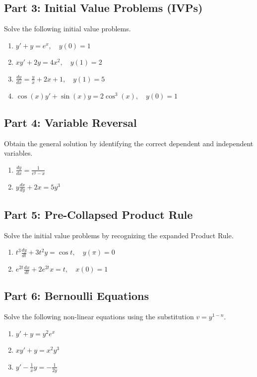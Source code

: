 \documentclass[11pt]{article}
\begin{document}
\subsection*{Part 3: Initial Value Problems (IVPs)}
Solve the following initial value problems.
\begin{enumerate}[label=\textbf{\arabic*.}, start=16]
    \item $\displaystyle y' + y = e^x, \quad y(0) = 1$
    \item $\displaystyle x y' + 2y = 4x^2, \quad y(1) = 2$
    \item $\displaystyle \frac{dy}{dx} = \frac{y}{x} + 2x + 1, \quad y(1) = 5$
    \item $\displaystyle \cos(x) y' + \sin(x)y = 2\cos^3(x), \quad y(0) = 1$
\end{enumerate}

\subsection*{Part 4: Variable Reversal}
Obtain the general solution by identifying the correct dependent and independent variables.
\begin{enumerate}[label=\textbf{\arabic*.}, start=20]
    \item $\displaystyle \frac{dy}{dx} = \frac{1}{e^y - x}$
    \item $\displaystyle y \frac{dx}{dy} + 2x = 5y^3$
\end{enumerate}

\subsection*{Part 5: Pre-Collapsed Product Rule}
Solve the initial value problems by recognizing the expanded Product Rule.
\begin{enumerate}[label=\textbf{\arabic*.}, start=22]
    \item $\displaystyle t^3 \frac{dy}{dt} + 3t^2 y = \cos t, \quad y(\pi) = 0$
    \item $\displaystyle e^{2t} \frac{dx}{dt} + 2e^{2t} x = t, \quad x(0) = 1$
\end{enumerate}

\subsection*{Part 6: Bernoulli Equations}
Solve the following non-linear equations using the substitution $v = y^{1-n}$.
\begin{enumerate}[label=\textbf{\arabic*.}, start=24]
    \item $\displaystyle y' + y = y^2 e^x$
    \item $\displaystyle x y' + y = x^2 y^3$
    \item $\displaystyle y' - \frac{1}{x}y = -\frac{1}{2y}$
\end{enumerate}
\end{document}
